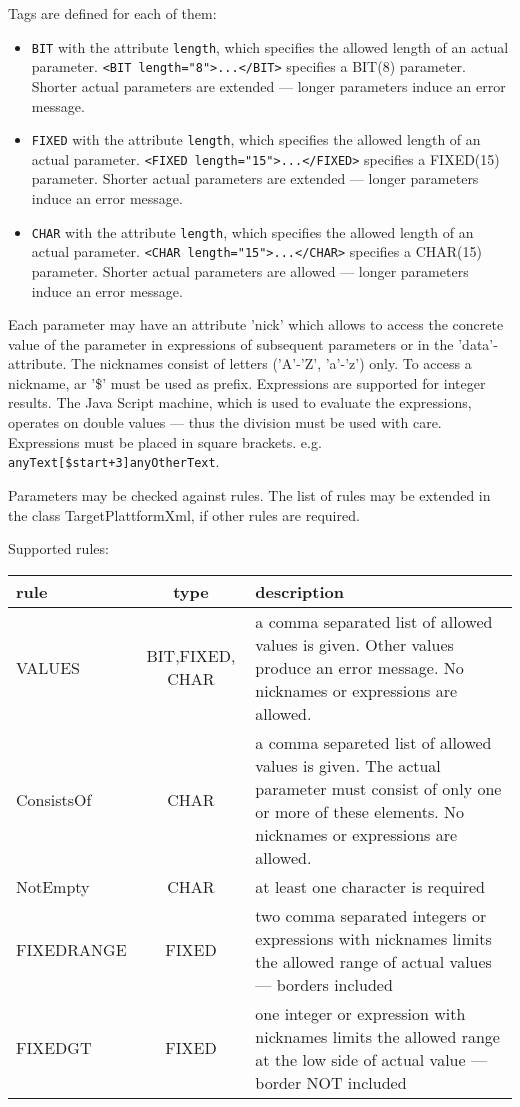 Tags are defined for each of them:
\begin{itemize}
\item \verb|BIT| with the attribute \verb|length|, which specifies the 
   allowed length of an actual parameter. \verb|<BIT length="8">...</BIT>|
   specifies a BIT(8) parameter. Shorter actual parameters are extended --- 
   longer parameters induce an error message.
\item \verb|FIXED| with the attribute \verb|length|, which specifies the 
   allowed length of an actual parameter. \verb|<FIXED length="15">...</FIXED>|
   specifies a FIXED(15) parameter. Shorter actual parameters are extended --- 
   longer parameters induce an error message.
\item \verb|CHAR| with the attribute \verb|length|, which specifies the 
   allowed length of an actual parameter. \verb|<CHAR length="15">...</CHAR>|
   specifies a CHAR(15) parameter. Shorter actual parameters are allowed --- 
   longer parameters induce an error message.
\end{itemize}

Each parameter may have an attribute 'nick' which allows to access 
the concrete value of the parameter in expressions of subsequent parameters
or in the 'data'-attribute. The nicknames consist of letters ('A'-'Z', 
'a'-'z') only. To access a nickname, ar '\$' must be used as prefix.
Expressions are supported for integer results. The Java Script machine,
which is used to evaluate the expressions, operates on double values ---
thus the division must be used with care.
Expressions must be placed in square brackets.
e.g. \verb|anyText[$start+3]anyOtherText|.

Parameters may be checked against rules. The list of rules may be extended
in the class TargetPlattformXml, if other rules are required.

Supported rules:

\begin{tabular}{|l|c|p{8cm}|}
\hline
rule & type & description \\
\hline
VALUES & BIT,FIXED, CHAR &
   a comma separated list of allowed values
   is given. Other values produce an error message. 
No nicknames or expressions are allowed.\\
\hline
ConsistsOf & CHAR &
a comma separeted list of allowed values is given. 
The actual parameter must consist of only one or more of these
elements.
No nicknames or expressions are allowed.\\
\hline
NotEmpty & CHAR & 
   at least one character is required \\   
\hline
FIXEDRANGE & FIXED &
   two comma separated integers or expressions with nicknames
 limits the allowed range
   of actual values --- borders included \\ 
\hline
FIXEDGT & FIXED &
   one integer or expression with nicknames
 limits the allowed range at the low side
   of actual value --- border NOT included \\ 
\hline
\end{tabular}

